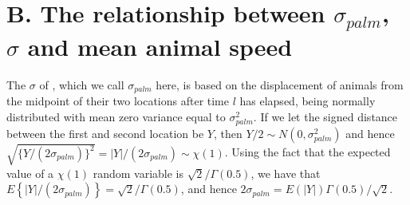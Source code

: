 \documentclass[useAMS, usenatbib, referee]{biom}\usepackage[]{graphicx}\usepackage[]{color}
\begin{document}






\section{B. The relationship between $\sigma_{palm}$, $\sigma$ and mean animal speed}
\label{appx:sigmaspd}

The $\sigma$ of \cite{Stevenson+al:18}, which we call $\sigma_{palm}$ here, is based on the displacement of animals from the midpoint of their two locations after time $l$ has elapsed, being normally distributed with mean zero variance equal to $\sigma_{palm}^2$. If we let the signed distance between the first and second location be $Y$, then $Y/2\sim N(0,\sigma_{palm}^2)$ and hence $\sqrt{\{Y/(2\sigma_{palm})\}^2}=|Y|/(2\sigma_{palm})\sim\chi(1)$. Using the fact that the expected value of a $\chi(1)$ random variable is $\sqrt{2}/\Gamma(0.5)$, we have that $E\left\{|Y|/(2\sigma_{palm})\right\}=\sqrt{2}/\Gamma(0.5)$, and hence $2\sigma_{palm}=E(|Y|)\Gamma(0.5)/\sqrt{2}$.
\end{document}
